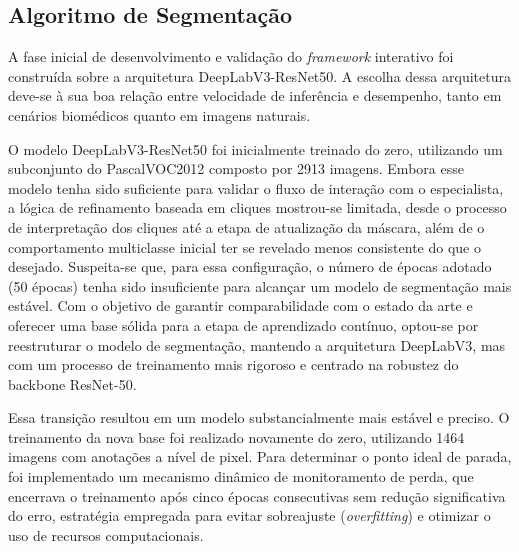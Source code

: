 

\subsection{Algoritmo de Segmentação}

A fase inicial de desenvolvimento e validação do \textit{framework} interativo foi construída sobre a arquitetura DeepLabV3-ResNet50. A escolha dessa arquitetura deve-se à sua boa relação entre velocidade de inferência e desempenho, tanto em cenários biomédicos quanto em imagens naturais.

O modelo DeepLabV3-ResNet50 foi inicialmente treinado do zero, utilizando um subconjunto do \ac{PascalVOC2012} composto por 2913 imagens. Embora esse modelo tenha sido suficiente para validar o fluxo de interação com o especialista, a lógica de refinamento baseada em cliques mostrou-se limitada, desde o processo de interpretação dos cliques até a etapa de atualização da máscara, além de o comportamento multiclasse inicial ter se revelado menos consistente do que o desejado. Suspeita-se que, para essa configuração, o número de épocas adotado (50 épocas) tenha sido insuficiente para alcançar um modelo de segmentação mais estável. Com o objetivo de garantir comparabilidade com o estado da arte e oferecer uma base sólida para a etapa de aprendizado contínuo, optou-se por reestruturar o modelo de segmentação, mantendo a arquitetura DeepLabV3, mas com um processo de treinamento mais rigoroso e centrado na robustez do backbone ResNet-50.




Essa transição resultou em um modelo substancialmente mais estável e preciso. O treinamento da nova base foi realizado novamente do zero, utilizando 1464 imagens com anotações a nível de pixel. Para determinar o ponto ideal de parada, foi implementado um mecanismo dinâmico de monitoramento de perda, que encerrava o treinamento após cinco épocas consecutivas sem redução significativa do erro, estratégia empregada para evitar sobreajuste (\textit{overfitting}) e otimizar o uso de recursos computacionais.

